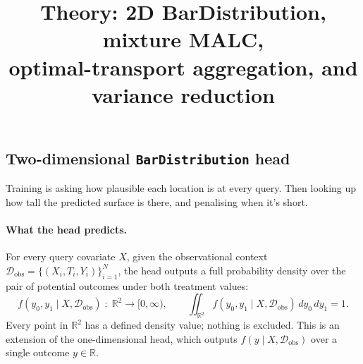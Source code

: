 \documentclass[11pt]{article}
\title{Theory: 2D BarDistribution, mixture MALC,\\
       optimal-transport aggregation, and variance reduction}
\author{}
\date{}
\theoremstyle{plain}
\theoremstyle{definition}
\theoremstyle{remark}
\begin{document}
\maketitle



\subsection{Two-dimensional \texttt{BarDistribution} head}
\label{sec:2d-bardistribution}

Training is asking how plausible each location is at every query. Then looking up how tall the predicted surface is there, and penalising when it's short.

\paragraph{What the head predicts.}
For every query covariate $X$, given the observational context
$\mathcal{D}_{\mathrm{obs}} = \{(X_i, T_i, Y_i)\}_{i=1}^{N}$, the head
outputs a full probability density over the pair of potential outcomes
under both treatment values:
\begin{equation}
  f(y_0, y_1 \mid X, \mathcal{D}_{\mathrm{obs}})
  \;:\; \mathbb{R}^2 \to [0, \infty),
  \qquad
  \iint_{\mathbb{R}^2}
    f(y_0, y_1 \mid X, \mathcal{D}_{\mathrm{obs}})\, dy_0\, dy_1 = 1.
\end{equation}
Every point in $\mathbb{R}^2$ has a defined density value; nothing is
excluded. This is an extension of the one-dimensional head, which outputs
$f(y \mid X, \mathcal{D}_{\mathrm{obs}})$ over a single outcome
$y \in \mathbb{R}$.
\end{document}
